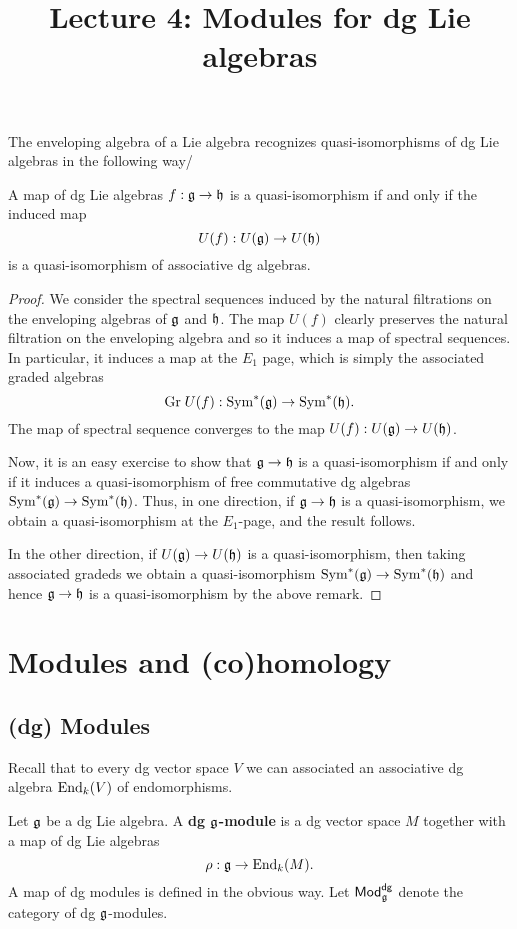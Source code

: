 \documentclass[11pt]{amsart}
\title{Lecture 4: Modules for dg Lie algebras}
\def\dgMod{{\sf Mod}^{\sf dg}}
\begin{document}
\maketitle

The enveloping algebra of a Lie algebra recognizes quasi-isomorphisms of dg Lie algebras in the following way/

\begin{lem}
A map of dg Lie algebras $f : \mathfrak g \to \mathfrak h$ is a quasi-isomorphism if and only if the induced map
\[
U(f) : U(\mathfrak g) \to U(\mathfrak h)
\]
is a quasi-isomorphism of associative dg algebras. 
\end{lem}
\begin{proof}
We consider the spectral sequences induced by the natural filtrations on the enveloping algebras of $\mathfrak g$ and $\mathfrak h$. 
The map $U(f)$ clearly preserves the natural filtration on the enveloping algebra and so it induces a map of spectral sequences. 
In particular, it induces a map at the $E_1$ page, which is simply the associated graded algebras
\[
{\rm Gr} \; U(f) : {\rm Sym}^*(\mathfrak g) \to {\rm Sym}^*(\mathfrak h) .
\] 
The map of spectral sequence converges to the map $U(f) : U(\mathfrak g) \to U(\mathfrak h)$. 

Now, it is an easy exercise to show that $\mathfrak g \to \mathfrak h$ is a quasi-isomorphism if and only if it induces a quasi-isomorphism of free commutative dg algebras ${\rm Sym}^*(\mathfrak g) \to {\rm Sym}^*(\mathfrak h)$. 
Thus, in one direction, if $\mathfrak g \to \mathfrak h$ is a quasi-isomorphism, we obtain a quasi-isomorphism at the $E_1$-page, and the result follows. 

In the other direction, if $U(\mathfrak g) \to U(\mathfrak h)$ is a quasi-isomorphism, then taking associated gradeds we obtain a quasi-isomorphism ${\rm Sym}^*(\mathfrak g) \to {\rm Sym}^*(\mathfrak h)$ and hence $\mathfrak g \to \mathfrak h$ is a quasi-isomorphism by the above remark. 
\end{proof}

\section{Modules and (co)homology}

\subsection{(dg) Modules}

Recall that to every dg vector space $V$ we can associated an associative dg algebra ${\rm End}_k(V)$ of endomorphisms. 

\begin{dfn}
Let $\mathfrak g$ be a dg Lie algebra.
A {\bf dg $\mathfrak g$-module} is a dg vector space $M$ together with a map of dg Lie algebras
\[
\rho : \mathfrak g \to {\rm End}_k(M) .
\]
A map of dg modules is defined in the obvious way. 
Let $\dgMod_{\fg}$ denote the category of dg $\mathfrak g$-modules. 
\end{dfn}
\end{document}
